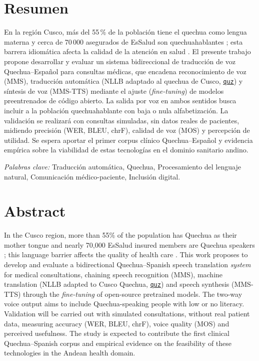 \documentclass[12pt,a4paper]{article}
\newcommand{\nuevo}[1]{#1}
\newcommand{\obsdos}[1]{\textcolor{verdeOK}{#1}}
\DeclareRobustCommand{\sig}[1]{\hyperlink{sig:#1}{\texttt{#1}}}
\begin{document}
\section*{Resumen}
\singlespacing\noindent
En la regi{\'o}n Cusco, m{\'a}s del 55\,\% de la poblaci{\'o}n tiene el quechua como lengua
materna y cerca de 70\,000 asegurados de EsSalud son quechuahablantes \parencite{essalud2023};
esta barrera idiom{\'a}tica afecta la calidad de la atenci{\'o}n en salud \parencite{begazo2026}.
El presente trabajo propone desarrollar y evaluar un sistema bidireccional de traducci{\'o}n de
voz Quechua--Espa{\~n}ol para consultas m{\'e}dicas, que encadena reconocimiento de voz (MMS),
traducci{\'o}n autom{\'a}tica (NLLB adaptado al quechua de Cusco, \sig{quz}) y s{\'i}ntesis de
voz (MMS-TTS) mediante el ajuste (\emph{fine-tuning}) de modelos preentrenados de c{\'o}digo
abierto. La salida por voz en ambos sentidos busca incluir a la poblaci{\'o}n quechuahablante con
baja o nula alfabetizaci{\'o}n. La validaci{\'o}n se realizar{\'a} con consultas simuladas, sin datos
reales de pacientes, midiendo precisi{\'o}n (WER, BLEU, chrF), calidad de voz (MOS) y percepci{\'o}n
de utilidad. Se espera aportar el primer corpus cl{\'i}nico Quechua--Espa{\~n}ol y evidencia
emp{\'i}rica sobre la viabilidad de estas tecnolog{\'i}as en el dominio sanitario andino.

\vspace{0.3cm}
\textit{Palabras clave:} \nuevo{Traducci{\'o}n autom{\'a}tica, Quechua, Procesamiento del
lenguaje natural, Comunicaci{\'o}n m{\'e}dico-paciente, Inclusi{\'o}n digital.}
\onehalfspacing

\section*{Abstract}
\singlespacing\noindent
\obsdos{In the Cusco region, more than 55\% of the population has Quechua as their mother tongue and
nearly 70{,}000 EsSalud insured members are Quechua speakers \parencite{essalud2023}; this language
barrier affects the quality of health care \parencite{begazo2026}. This work proposes to develop and
evaluate a bidirectional Quechua--Spanish speech translation \emph{system} for medical consultations,
chaining speech recognition (MMS), machine translation (NLLB adapted to Cusco Quechua, \sig{quz}) and
speech synthesis (MMS-TTS) through the \emph{fine-tuning} of open-source pretrained models. The
two-way voice output aims to include Quechua-speaking people with low or no literacy. Validation will
be carried out with simulated consultations, without real patient data, measuring accuracy (WER,
BLEU, chrF), voice quality (MOS) and perceived usefulness. The study is expected to contribute the
first clinical Quechua--Spanish corpus and empirical evidence on the feasibility of these
technologies in the Andean health domain.}
\end{document}
